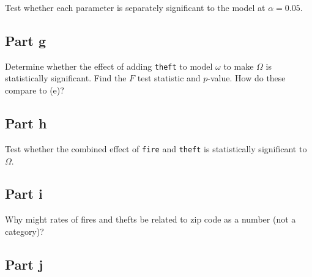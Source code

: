 \begin{question}
    Test whether each parameter is separately significant to the model at $\alpha = 0.05$.
\end{question}

\begin{answer}
    
\end{answer}

\subsection{Part g}

\begin{question}
    Determine whether the effect of adding \verb+theft+ to model $\omega$ to make $\Omega$ is statistically significant. Find the $F$ test statistic and $p$-value. How do these compare to (e)?
\end{question}

\begin{answer}
    
\end{answer}

\subsection{Part h}

\begin{question}
    Test whether the combined effect of \verb+fire+ and \verb+theft+ is statistically significant to $\Omega$.
\end{question}

\begin{answer}
    
\end{answer}

\subsection{Part i}

\begin{question}
    Why might rates of fires and thefts be related to zip code as a number (not a category)?
\end{question}

\begin{answer}
    
\end{answer}

\subsection{Part j}


